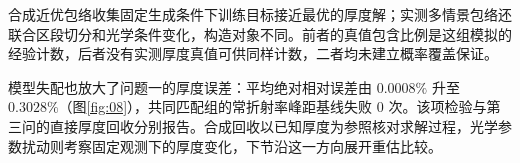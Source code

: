 合成近优包络收集固定生成条件下训练目标接近最优的厚度解；实测多情景包络还联合区段切分和光学条件变化，构造对象不同。前者的真值包含比例是这组模拟的经验计数，后者没有实测厚度真值可供同样计数，二者均未建立概率覆盖保证。

模型失配也放大了问题一的厚度误差：平均绝对相对误差由 $0.0008\%$ 升至 $0.3028\%$（图\ref{fig:08}），共同匹配组的常折射率峰距基线失败 $0$ 次。该项检验与第三问的直接厚度回收分别报告。合成回收以已知厚度为参照核对求解过程，光学参数扰动则考察固定观测下的厚度变化，下节沿这一方向展开重估比较。
